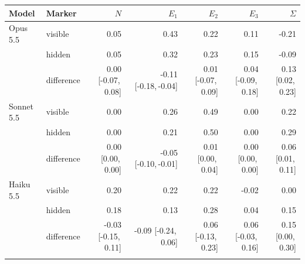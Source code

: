 \begin{tabular}{@{}llrrrrr@{}}
\toprule
Model & Marker & $N$ & $E_1$ & $E_2$ & $E_3$ & $\Sigma$ \\
\midrule
Opus 5.5 & visible & 0.05 & 0.43 & 0.22 & 0.11 & -0.21 \\
 & hidden & 0.05 & 0.32 & 0.23 & 0.15 & -0.09 \\
 & difference & 0.00 {\scriptsize[-0.07,\,0.08]} & -0.11 {\scriptsize[-0.18,\,-0.04]} & 0.01 {\scriptsize[-0.07,\,0.09]} & 0.04 {\scriptsize[-0.09,\,0.18]} & 0.13 {\scriptsize[0.02,\,0.23]} \\
\addlinespace[2pt]
Sonnet 5.5 & visible & 0.00 & 0.26 & 0.49 & 0.00 & 0.22 \\
 & hidden & 0.00 & 0.21 & 0.50 & 0.00 & 0.29 \\
 & difference & 0.00 {\scriptsize[0.00,\,0.00]} & -0.05 {\scriptsize[-0.10,\,-0.01]} & 0.01 {\scriptsize[0.00,\,0.04]} & 0.00 {\scriptsize[0.00,\,0.00]} & 0.06 {\scriptsize[0.01,\,0.11]} \\
\addlinespace[2pt]
Haiku 5.5 & visible & 0.20 & 0.22 & 0.22 & -0.02 & 0.00 \\
 & hidden & 0.18 & 0.13 & 0.28 & 0.04 & 0.15 \\
 & difference & -0.03 {\scriptsize[-0.15,\,0.11]} & -0.09 {\scriptsize[-0.24,\,0.06]} & 0.06 {\scriptsize[-0.13,\,0.23]} & 0.06 {\scriptsize[-0.03,\,0.16]} & 0.15 {\scriptsize[0.00,\,0.30]} \\
\addlinespace[2pt]
\bottomrule
\end{tabular}
